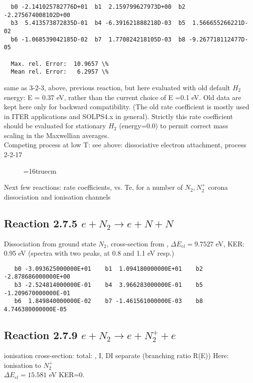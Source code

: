 \documentclass[12pt,dvipdfmx]{article}
\begin{document}
\begin{small}\begin{verbatim}
  b0 -2.141025782776D+01  b1  2.159799627973D+00  b2 -2.275674008102D+00
  b3  5.413573872835D-01  b4 -6.391621888218D-03  b5  1.566655266221D-02
  b6 -1.068539042185D-02  b7  1.770824218105D-03  b8 -9.267718112477D-05

  Max. rel. Error:  10.9657 \%
  Mean rel. Error:   6.2957 \%
\end{verbatim}
\end{small}
same as 3-2-3, above, previous reaction, but here evaluated with old default $H_2$ energy: E = 0.37 eV, rather than
the current choice of E =0.1 eV.
Old data are kept here only for backward compatibility.
(The old rate coefficient is mostly used in ITER applications
and SOLPS4.x in general).
Strictly this rate coefficient should be evaluated for stationary $H_2$  (energy=0.0) to permit
correct mass scaling in the Maxwellian averages.
\\
Competing process at low T: see above: dissociative electron attachment, process 2-2-17

\begin{figure} \label{3.2.3o}
\epsfxsize=16truecm
\end{figure}
\newpage


Next few reactions:  rate coefficients, vs. Te, for a number of $N_2, N_2^+$ corona dissociation and ionisation channels
\subsection{
Reaction 2.7.5  $e + N_2 \rightarrow e + N + N$ }
Dissociation from ground state $N_2$, cross-section from \cite{kn:Cosby},
$\Delta E_{el} = 9.7527 $ eV, KER: 0.95 eV  (spectra with two peaks, at 0.8 and 1.1 eV resp.)


\begin{small}\begin{verbatim}
   b0 -3.093625000000E+01    b1  1.094180000000E+01    b2 -2.878686000000E+00
   b3 -2.524814000000E-01    b4  3.966283000000E-01    b5 -1.209670000000E-01
   b6  1.849840000000E-02    b7 -1.461561000000E-03    b8  4.746380000000E-05
\end{verbatim}\end{small}


\subsection{
Reaction 2.7.9  $e + N_2 \rightarrow e + N_2^+ + e$ }
ionisation cross-section: total: \cite{kn:Rapp1}, I, DI separate \cite{kn:Rapp2} (branching ratio R(E))
Here: ionisation to $N_2^+$ \\
$\Delta E_{el} = 15.581 $ eV KER=0.
\end{document}
